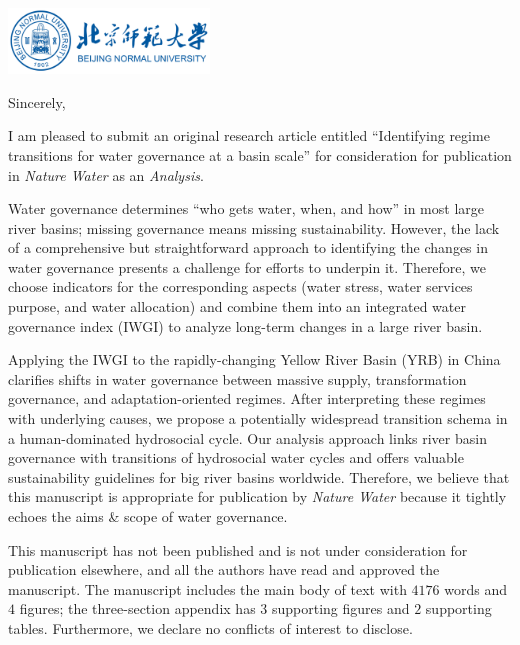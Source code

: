 \documentclass[11pt,a4paper,roman]{moderncv}
\begin{document}
\begin{minipage}[t]{\textwidth}
\includegraphics[width=0.40\textwidth]{bnu}
\end{minipage}


\opening{\vspace*{-2em}}
\closing{Sincerely,}{\vspace*{-2em}}
\makelettertitle

I am pleased to submit an original research article entitled ``Identifying regime transitions for water governance at a basin scale'' for consideration for publication in \textit{Nature Water} as an \textit{Analysis}.

Water governance determines ``who gets water, when, and how'' in most large river basins; missing governance means missing sustainability. However, the lack of a comprehensive but straightforward approach to identifying the changes in water governance presents a challenge for efforts to underpin it. Therefore, we choose indicators for the corresponding aspects (water stress, water services purpose, and water allocation) and combine them into an integrated water governance index (IWGI) to analyze long-term changes in a large river basin.

Applying the IWGI to the rapidly-changing Yellow River Basin (YRB) in China clarifies shifts in water governance between massive supply, transformation governance, and adaptation-oriented regimes. After interpreting these regimes with underlying causes, we propose a potentially widespread transition schema in a human-dominated hydrosocial cycle. Our analysis approach links river basin governance with transitions of hydrosocial water cycles and offers valuable sustainability guidelines for big river basins worldwide. Therefore, we believe that this manuscript is appropriate for publication by \textit{Nature Water} because it tightly echoes the aims \& scope of water governance.

This manuscript has not been published and is not under consideration for publication elsewhere, and all the authors have read and approved the manuscript. The manuscript includes the main body of text with $4176$ words and $4$ figures; the three-section appendix has $3$ supporting figures and $2$ supporting tables. Furthermore, we declare no conflicts of interest to disclose. 
\end{document}
